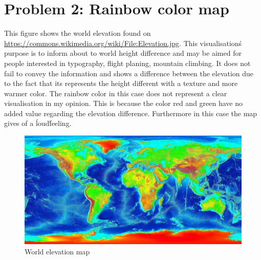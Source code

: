 \newpage
\section{Problem 2: Rainbow color map}
This figure shows the world elevation found on \url{https://commons.wikimedia.org/wiki/File:Elevation.jpg}. This visualisation\'s purpose is to inform about to world height difference and may be aimed for people interested in typography, flight planing, mountain climbing. It does not fail to convey the information and shows a difference between the elevation due to the fact that its represents the height different with a texture and more warmer color. The rainbow color in this case does not represent a clear visualisation in my opinion. This is because the color red and green have no added value regarding the elevation difference. Furthermore in this case the map gives of a \'loud\' feeling.


\begin{figure}[!htb]
    \centering
    \includegraphics[width=\linewidth]{Figures/Elevation.jpg}
    \caption{World elevation map}
    \label{fig:elev}
\end{figure}